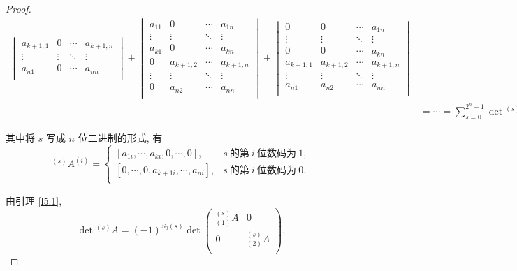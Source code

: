 \documentclass[color=black,device=normal,lang=cn,mode=geye]{elegantnote}
\begin{document}
\begin{landscape}
\begin{proof}
\begin{align*}
\begin{vmatrix}
            a_{k+1,1} & 0 & \cdots & a_{k+1,n} \\
            \vdots & \vdots & \ddots & \vdots \\
            a_{n1} & 0 & \cdots & a_{nn} \\
        \end{vmatrix}+\begin{vmatrix}
            a_{11} & 0 & \cdots & a_{1n} \\
            \vdots & \vdots & \ddots & \vdots \\
            a_{k1} & 0 & \cdots & a_{kn} \\
            0 & a_{k+1,2} & \cdots & a_{k+1,n} \\
            \vdots & \vdots & \ddots & \vdots \\
            0 & a_{n2} & \cdots & a_{nn} \\
        \end{vmatrix}+\begin{vmatrix}
            0 & 0 & \cdots & a_{1n} \\
            \vdots & \vdots & \ddots & \vdots \\
            0 & 0 & \cdots & a_{kn} \\
            a_{k+1,1} & a_{k+1,2} & \cdots & a_{k+1,n} \\
            \vdots & \vdots & \ddots & \vdots \\
            a_{n1} & a_{n2} & \cdots & a_{nn} \\
        \end{vmatrix} \\
        & =\cdots=\sum\limits_{s=0}^{2^n-1}\det{}^{(s)}A,
    \end{align*}

    其中将 $s$ 写成 $n$ 位二进制的形式, 有
    \[^{(s)}A^{(i)}=\begin{cases}
        [a_{1i},\cdots,a_{ki},0,\cdots,0], & s\ \text{的第}\ i\ \text{位数码为}\ 1, \\
        [0,\cdots,0,a_{k+1i},\cdots,a_{ni}], & s\ \text{的第}\ i\ \text{位数码为}\ 0 .\\
    \end{cases}\]

    由引理 \ref{l5.1},
    \[\det{}^{(s)}A=(-1)^{S_0(s)}\det\begin{pmatrix}
        {}_{(1)}^{(s)}A & 0 \\
        0 & {}_{(2)}^{(s)}A \\
    \end{pmatrix},\]


\end{proof}
\end{landscape}
\end{document}
